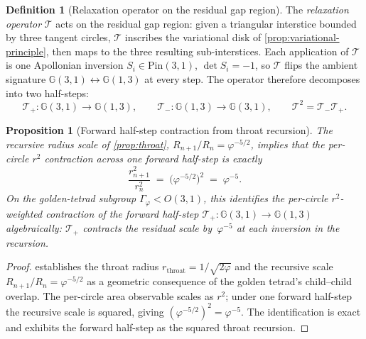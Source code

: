 \documentclass[11pt,a4paper]{article}
\theoremstyle{plain}
\newtheorem{proposition}[theorem]{Proposition}
\theoremstyle{definition}
\newtheorem{definition}[theorem]{Definition}
\theoremstyle{remark}
\numberwithin{equation}{section}
\newcommand{\Cl}{\mathbb{G}}
\newcommand{\vp}{\varphi}
\begin{document}
\begin{definition}[Relaxation operator on the residual gap region]
\label{def:relaxation-operator}
The \emph{relaxation operator} \(\mathcal{T}\) acts on the residual
gap region: given a triangular interstice bounded by three tangent
circles, \(\mathcal{T}\) inscribes the variational disk of
\cref{prop:variational-principle}, then maps to the three resulting
sub-interstices.  Each application of \(\mathcal{T}\) is one Apollonian
inversion \(S_i\in\mathrm{Pin}(3,1)\), \(\det S_i=-1\), so
\(\mathcal{T}\) flips the ambient signature
\(\Cl(3,1)\leftrightarrow\Cl(1,3)\) at every step.  The operator
therefore decomposes into two half-steps:
\[
  \mathcal{T}_{+}\colon\Cl(3,1)\to\Cl(1,3),
  \qquad
  \mathcal{T}_{-}\colon\Cl(1,3)\to\Cl(3,1),
  \qquad
  \mathcal{T}^{2}=\mathcal{T}_{-}\mathcal{T}_{+}.
\]
\end{definition}

\begin{proposition}[Forward half-step contraction from throat recursion]
\label{prop:forward-eigenvalue-throat}
The recursive radius scale of \cref{prop:throat},
\(R_{n+1}/R_n=\vp^{-5/2}\), implies that the per-circle \(r^2\)
contraction across one forward half-step is exactly
\[
  \frac{r_{n+1}^{2}}{r_{n}^{2}} \;=\; \bigl(\vp^{-5/2}\bigr)^{2} \;=\; \vp^{-5}.
\]
On the golden-tetrad subgroup \(\Gamma_\vp<O(3,1)\), this identifies the
per-circle \(r^2\)-weighted contraction of the forward half-step
\(\mathcal{T}_{+}\colon\Cl(3,1)\to\Cl(1,3)\) algebraically:
\(\mathcal{T}_{+}\) contracts the residual scale by~\(\vp^{-5}\) at each
inversion in the recursion.
\end{proposition}

\begin{proof}
 establishes the throat radius
\(r_{\mathrm{throat}}=1/\sqrt{2\vp}\) and the recursive scale
\(R_{n+1}/R_n=\vp^{-5/2}\) as a geometric consequence of the golden
tetrad's child--child overlap.  The per-circle area observable scales
as \(r^2\); under one forward half-step the recursive scale is squared,
giving \((\vp^{-5/2})^{2}=\vp^{-5}\).  The identification is exact and
exhibits the forward half-step as the squared throat recursion.
\end{proof}
\end{document}
